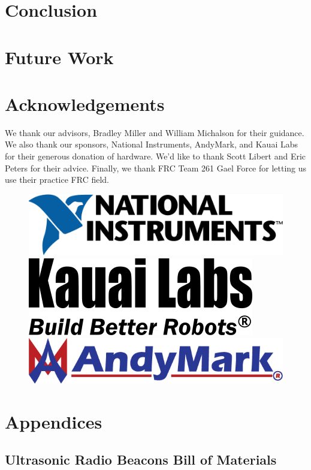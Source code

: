\documentclass{article}
\begin{document}
\section{Conclusion} \label{section:conclusion}




\section{Future Work} \label{section:future_work}




\section{Acknowledgements}

  We thank our advisors, Bradley Miller and William Michalson for their guidance. We also thank our sponsors, National Instruments, AndyMark, and Kauai Labs for their generous donation of hardware. We'd like to thank Scott Libert and Eric Peters for their advice. Finally, we thank FRC Team 261 Gael Force for letting us use their practice FRC field.

  \begin{figure}[H]
    \centering
    \includegraphics[width=0.30\linewidth]{./images/ni_logo_2c.png}
    \hspace*{0.1in}
    \includegraphics[width=0.25\linewidth]{./images/Logo_Type_KauaiLabs_BuildBetterRobots_TrademarkSmaller.png}
    \hspace*{0.1in}
    \includegraphics[width=0.30\linewidth]{./images/AndyMark_MedWeb.jpg}
    \caption*{}
    \label{fig:sponsors}
  \end{figure}





\section{Appendices}

  \subsection{Ultrasonic Radio Beacons Bill of Materials} \label{appendix:beacon_bom}
\end{document}
